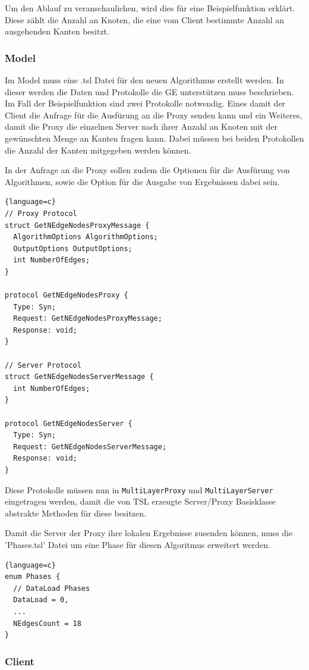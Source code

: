 Um den Ablauf zu veranschaulichen, wird dies für eine Beispielfunktion erklärt. Diese zählt die Anzahl an Knoten, die eine vom Client bestimmte Anzahl an ausgehenden Kanten besitzt.

\subsubsection{Model}

Im Model muss eine .tsl Datei für den neuen Algorithmus erstellt werden. In dieser werden die Daten und Protokolle die GE unterstützen muss beschrieben. Im Fall der Beispielfunktion sind zwei Protokolle notwendig.
Eines damit der Client die Anfrage für die Ausfürung an die Proxy senden kann und ein Weiteres, damit die Proxy die einzelnen Server nach ihrer Anzahl an Knoten mit der gewünschten Menge an Kanten fragen kann.
Dabei müssen bei beiden Protokollen die Anzahl der Kanten mitgegeben werden können.

In der Anfrage an die Proxy sollen zudem die Optionen für die Ausfürung von Algorithmen, sowie die Option für die Ausgabe von Ergebnissen dabei sein.

\begin{lstlisting}{language=c}
// Proxy Protocol
struct GetNEdgeNodesProxyMessage {
  AlgorithmOptions AlgorithmOptions;
  OutputOptions OutputOptions;
  int NumberOfEdges;  
}

protocol GetNEdgeNodesProxy {
  Type: Syn;
  Request: GetNEdgeNodesProxyMessage;
  Response: void;
}

// Server Protocol
struct GetNEdgeNodesServerMessage {
  int NumberOfEdges;
}

protocol GetNEdgeNodesServer {
  Type: Syn;
  Request: GetNEdgeNodesServerMessage;
  Response: void;
}
\end{lstlisting}

Diese Protokolle müssen nun in \verb|MultiLayerProxy| und \verb|MultiLayerServer| eingetragen werden, damit die von TSL erzeugte Server/Proxy Basisklasse abstrakte Methoden für diese besitzen.

Damit die Server der Proxy ihre lokalen Ergebnisse zusenden können, muss die 'Phases.tsl' Datei um eine Phase für diesen Algoritmus erweitert werden.

\begin{lstlisting}{language=c}
enum Phases {
  // DataLoad Phases
  DataLoad = 0,
  ...
  NEdgesCount = 18
}
\end{lstlisting}


\subsubsection{Client}

